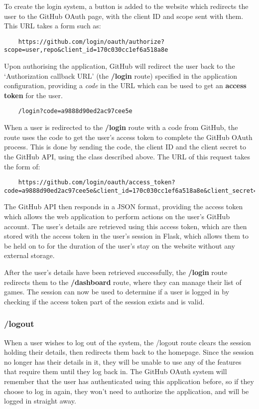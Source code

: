 	To create the login system, a button is added to the website which redirects the user to the GitHub OAuth page, with the client ID and scope sent with them. This URL takes a form such as:

	\begin{lstlisting}
	https://github.com/login/oauth/authorize?scope=user,repo&client_id=170c030cc1ef6a518a8e\end{lstlisting}

	Upon authorising the application, GitHub will redirect the user back to the `Authorization callback URL' (the \textbf{/login} route) specified in the application configuration, providing a \emph{code} in the URL which can be used to get an \textbf{access token} for the user.

	\begin{lstlisting}
	/login?code=a9888d90ed2ac97cee5e\end{lstlisting}

	When a user is redirected to the \textbf{/login} route with a code from GitHub, the route uses the code to get the user's access token to complete the GitHub OAuth process. This is done by sending the code, the client ID and the client secret to the GitHub API, using the class described above. The URL of this request takes the form of:

	\begin{lstlisting}
	https://github.com/login/oauth/access_token?code=a9888d90ed2ac97cee5e&client_id=170c030cc1ef6a518a8e&client_secret=3oeqft9w9zd536m0oxar\end{lstlisting}

	The GitHub API then responds in a JSON format, providing the access token which allows the web application to perform actions on the user's GitHub account. The user's details are retrieved using this access token, which are then stored with the access token in the user's session in Flask, which allows them to be held on to for the duration of the user's stay on the website without any external storage. 

	After the user's details have been retrieved successfully, the \textbf{/login} route redirects them to the \textbf{/dashboard} route, where they can manage their list of games. The session can now be used to determine if a user is logged in by checking if the access token part of the session exists and is valid.

	\subsubsection{/logout}
	When a user wishes to log out of the system, the /logout route clears the session holding their details, then redirects them back to the homepage. Since the session no longer has their details in it, they will be unable to use any of the features that require them until they log back in. The GitHub OAuth system will remember that the user has authenticated using this application before, so if they choose to log in again, they won't need to authorize the application, and will be logged in straight away.

